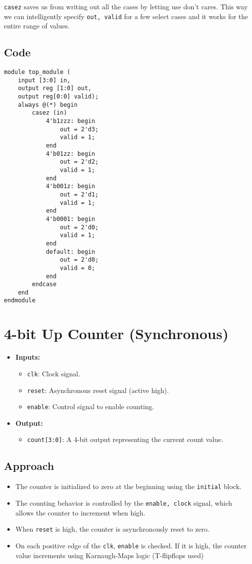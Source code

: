\documentclass{article}
\begin{document}
\texttt{casez} saves us from writing out all the cases by letting use don't cares. This way we can intelligently specify \texttt{out, valid} for a few select cases and it works for the entire range of values.
\subsection*{Code}
\begin{lstlisting}[style=style]
module top_module (
    input [3:0] in,
    output reg [1:0] out, 
    output reg[0:0] valid);
    always @(*) begin
        casez (in)
            4'b1zzz: begin 
                out = 2'd3;
                valid = 1;
            end
            4'b01zz: begin
                out = 2'd2; 
                valid = 1;
            end
            4'b001z: begin
                out = 2'd1;
                valid = 1;
            end
            4'b0001: begin
                out = 2'd0;
                valid = 1;
            end
            default: begin
                out = 2'd0;
                valid = 0;
            end
        endcase
    end
endmodule
\end{lstlisting}
\section{4-bit Up Counter (Synchronous)}
\begin{itemize}
    \item \textbf{Inputs:}
    \begin{itemize}
        \item \texttt{clk}: Clock signal.
        \item \texttt{reset}: Asynchronous reset signal (active high).
        \item \texttt{enable}: Control signal to enable counting.
    \end{itemize}
    \item \textbf{Output:}
    \begin{itemize}
        \item \texttt{count[3:0]}: A 4-bit output representing the current count value.
    \end{itemize}
\end{itemize}

\subsection*{Approach}
\begin{itemize}
    \item The counter is initialized to zero at the beginning using the \texttt{initial} block.
    \item The counting behavior is controlled by the \texttt{enable, clock} signal, which allows the counter to increment when high.
    \item When \texttt{reset} is high, the counter is asynchronously reset to zero.
    \item On each positive edge of the \texttt{clk}, \texttt{enable} is checked. If it is high, the counter value increments using Karnaugh-Maps logic (T-flipflops used)
\end{itemize}
\end{document}
